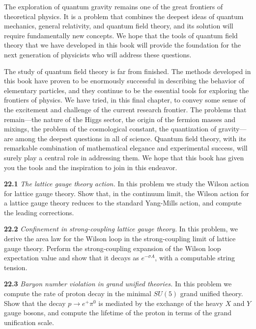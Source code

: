 The exploration of quantum gravity remains one of the great frontiers of
theoretical physics.  It is a problem that combines the deepest ideas of
quantum mechanics, general relativity, and quantum field theory, and its
solution will require fundamentally new concepts.  We hope that the tools of
quantum field theory that we have developed in this book will provide the
foundation for the next generation of physicists who will address these
questions.

The study of quantum field theory is far from finished.  The methods
developed in this book have proven to be enormously successful in describing
the behavior of elementary particles, and they continue to be the essential
tools for exploring the frontiers of physics.  We have tried, in this final
chapter, to convey some sense of the excitement and challenge of the current
research frontier.  The problems that remain---the nature of the Higgs
sector, the origin of the fermion masses and mixings, the problem of the
cosmological constant, the quantization of gravity---are among the deepest
questions in all of science.  Quantum field theory, with its remarkable
combination of mathematical elegance and experimental success, will surely
play a central role in addressing them.  We hope that this book has given you
the tools and the inspiration to join in this endeavor.

\problems

\textbf{22.1} \emph{The lattice gauge theory action.}  In this problem we
study the Wilson action for lattice gauge theory.  Show that, in the
continuum limit, the Wilson action for a lattice gauge theory reduces to the
standard Yang-Mills action, and compute the leading corrections.

\textbf{22.2} \emph{Confinement in strong-coupling lattice gauge theory.}
In this problem, we derive the area law for the Wilson loop in the
strong-coupling limit of lattice gauge theory.  Perform the strong-coupling
expansion of the Wilson loop expectation value and show that it decays as
$e^{-\sigma A}$, with a computable string tension.

\textbf{22.3} \emph{Baryon number violation in grand unified theories.}
In this problem we compute the rate of proton decay in the minimal $SU(5)$
grand unified theory.  Show that the decay $p\to e^{+}\pi^0$ is mediated by
the exchange of the heavy $X$ and $Y$ gauge bosons, and compute the lifetime
of the proton in terms of the grand unification scale.

